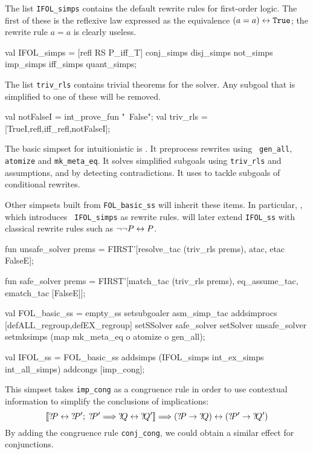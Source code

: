 The list {\tt IFOL_simps} contains the default rewrite rules for
first-order logic.  The first of these is the reflexive law expressed
as the equivalence $(a=a)\leftrightarrow{\tt True}$; the rewrite rule $a=a$ is
clearly useless.
\begin{ttbox}
val IFOL_simps =
   [refl RS P_iff_T] \at conj_simps \at disj_simps \at not_simps \at 
    imp_simps \at iff_simps \at quant_simps;
\end{ttbox}
The list {\tt triv_rls} contains trivial theorems for the solver.  Any
subgoal that is simplified to one of these will be removed.
\begin{ttbox}
val notFalseI = int_prove_fun "~False";
val triv_rls = [TrueI,refl,iff_refl,notFalseI];
\end{ttbox}
%
The basic simpset for intuitionistic \FOL{} is
.  It preprocess rewrites using {\tt
  gen_all}, {\tt atomize} and {\tt mk_meta_eq}.  It solves simplified
subgoals using {\tt triv_rls} and assumptions, and by detecting
contradictions.  It uses  to tackle subgoals of
conditional rewrites.

Other simpsets built from {\tt FOL_basic_ss} will inherit these items.
In particular, , which introduces {\tt
  IFOL_simps} as rewrite rules.   will later
extend {\tt IFOL_ss} with classical rewrite rules such as $\neg\neg
P\leftrightarrow P$.
\begin{ttbox}
fun unsafe_solver prems = FIRST'[resolve_tac (triv_rls {\at} prems),
                                 atac, etac FalseE];

fun   safe_solver prems = FIRST'[match_tac (triv_rls {\at} prems),
                                 eq_assume_tac, ematch_tac [FalseE]];

val FOL_basic_ss = empty_ss setsubgoaler asm_simp_tac
                            addsimprocs [defALL_regroup,defEX_regroup]
                            setSSolver   safe_solver
                            setSolver  unsafe_solver
                            setmksimps (map mk_meta_eq o atomize o gen_all);

val IFOL_ss = FOL_basic_ss addsimps (IFOL_simps {\at} int_ex_simps {\at} int_all_simps)
                           addcongs [imp_cong];
\end{ttbox}
This simpset takes {\tt imp_cong} as a congruence rule in order to use
contextual information to simplify the conclusions of implications:
\[ \List{\Var{P}\bimp\Var{P'};\; \Var{P'} \Imp \Var{Q}\bimp\Var{Q'}} \Imp
   (\Var{P}\imp\Var{Q}) \bimp (\Var{P'}\imp\Var{Q'})
\]
By adding the congruence rule {\tt conj_cong}, we could obtain a similar
effect for conjunctions.


